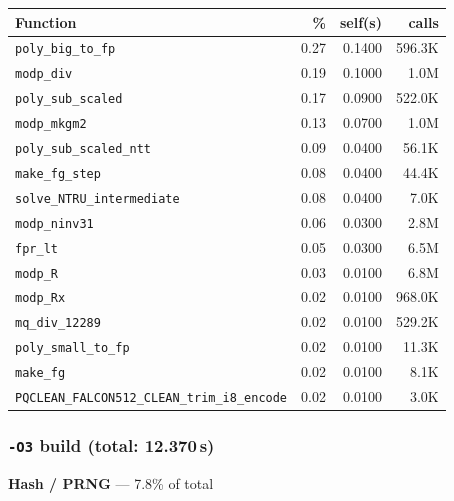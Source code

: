 \documentclass[11pt,a4paper]{article}
\begin{document}
\begin{longtable}{p{7.5cm}rrr}
\toprule
Function & \% & self(s) & calls \\
\midrule
\endhead
  \texttt{poly\_big\_to\_fp} & 0.27 & 0.1400 & 596.3K \\
  \texttt{modp\_div} & 0.19 & 0.1000 & 1.0M \\
  \texttt{poly\_sub\_scaled} & 0.17 & 0.0900 & 522.0K \\
  \texttt{modp\_mkgm2} & 0.13 & 0.0700 & 1.0M \\
  \texttt{poly\_sub\_scaled\_ntt} & 0.09 & 0.0400 & 56.1K \\
  \texttt{make\_fg\_step} & 0.08 & 0.0400 & 44.4K \\
  \texttt{solve\_NTRU\_intermediate} & 0.08 & 0.0400 & 7.0K \\
  \texttt{modp\_ninv31} & 0.06 & 0.0300 & 2.8M \\
  \texttt{fpr\_lt} & 0.05 & 0.0300 & 6.5M \\
  \texttt{modp\_R} & 0.03 & 0.0100 & 6.8M \\
  \texttt{modp\_Rx} & 0.02 & 0.0100 & 968.0K \\
  \texttt{mq\_div\_12289} & 0.02 & 0.0100 & 529.2K \\
  \texttt{poly\_small\_to\_fp} & 0.02 & 0.0100 & 11.3K \\
  \texttt{make\_fg} & 0.02 & 0.0100 & 8.1K \\
  \texttt{PQCLEAN\_FALCON512\_CLEAN\_trim\_i8\_encode} & 0.02 & 0.0100 & 3.0K \\
\bottomrule
\end{longtable}

\subsubsection*{\texttt{-O3} build (total: 12.370\,s)}

\noindent\colorbox{hashcolor}{\strut \textbf{Hash / PRNG} --- 7.8\% of total}
\vspace{2pt}
\end{document}
